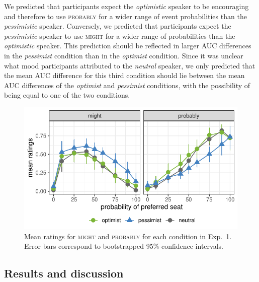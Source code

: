 We predicted that participants expect the \textit{optimistic} speaker to be encouraging and therefore to use \textsc{probably} for a wider range of event probabilities than the \textit{pessimistic} speaker. Conversely, we predicted that participants expect the \textit{pessimistic} speaker to use \textsc{might} for a wider range of probabilities than the \textit{optimistic} speaker. This prediction should be reflected in larger AUC differences in the \textit{pessimist} condition than in the \textit{optimist} condition. Since it was unclear what mood participants attributed to the \textit{neutral} speaker, we only predicted that the mean AUC difference for this third condition should lie between the mean AUC differences of the \textit{optimist} and \textit{pessimist} conditions, with the possibility of being equal to one of the two conditions.

\begin{figure}[t]
    \centering
    \includegraphics[width=\columnwidth, trim={0 0.75cm 0 0cm}]{./plots/norming.pdf}
    \caption{Mean ratings for \textsc{might} and \textsc{probably} for each condition in Exp.~1. Error bars correspond to bootstrapped 95\%-confidence intervals.}
    \label{fig:results-exp1}
\end{figure}

\subsection{Results and discussion}

